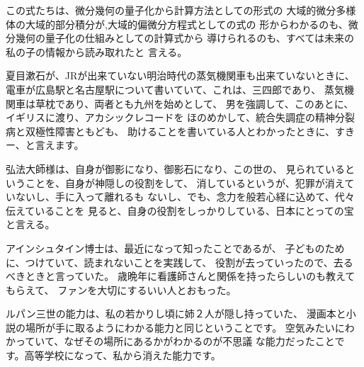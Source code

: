\documentclass{jsarticle}
\begin{document}
    この式たちは、微分幾何の量子化から計算方法としての形式の
    大域的微分多様体の大域的部分積分が,大域的偏微分方程式としての式の
    形からわかるのも、微分幾何の量子化の仕組みとしての計算式から
    導けられるのも、すべては未来の私の子の情報から読み取れたと
    言える。
 
    夏目漱石が、JRが出来ていない明治時代の蒸気機関車も出来ていないときに、
    電車が広島駅と名古屋駅について書いていて、これは、三四郎であり、
    蒸気機関車は草枕であり、両者とも九州を始めとして、
    男を強調して、このあとに、イギリスに渡り、アカシックレコードを
    ほのめかして、統合失調症の精神分裂病と双極性障害ともども、
    助けることを書いている人とわかったときに、すきー、と言えます。

    弘法大師様は、自身が御影になり、御影石になり、この世の、
    見られているということを、自身が神隠しの役割をして、
    消しているというが、犯罪が消えていないし、手に入って離れるも
    ないし、でも、念力を般若心経に込めて、代々伝えていることを
    見ると、自身の役割をしっかりしている、日本にとっての宝と言える。

    アインシュタイン博士は、最近になって知ったことであるが、
    子どものために、つけていて、読まれないことを実践して、
    役割が去っていったので、去るべきときと言っていた。
    歳晩年に看護師さんと関係を持ったらしいのも教えてもらえて、
    ファンを大切にするいい人とおもった。


    ルパン三世の能力は、私の若かりし頃に姉２人が隠し持っていた、
    漫画本と小説の場所が手に取るようにわかる能力と同じということです。
    空気みたいにわかっていて、なぜその場所にあるかがわかるのが不思議
    な能力だったことです。高等学校になって、私から消えた能力です。

    
\end{document}
